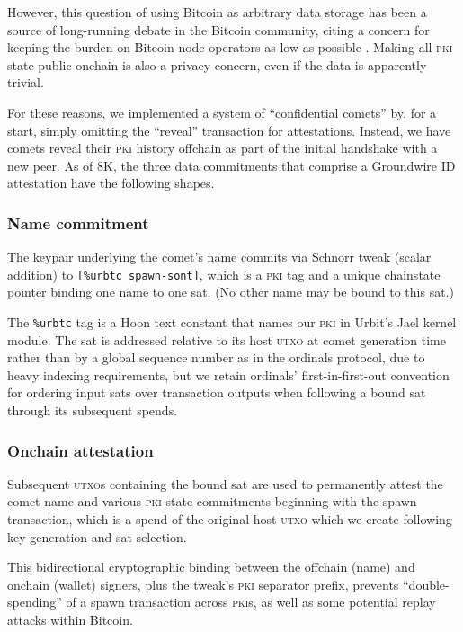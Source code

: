 \documentclass[twoside]{article}
\begin{document}
However, this question of using Bitcoin as arbitrary data storage has
been a source of long-running debate in the Bitcoin community, citing a
concern for keeping the burden on Bitcoin node operators as low as
possible \citep{BIP0110}. Making all \textsc{pki}
state public onchain is also a privacy concern, even if the data is
apparently trivial.

For these reasons, we implemented a system of ``confidential comets''
by, for a start, simply omitting the ``reveal'' transaction for
attestations. Instead, we have comets reveal their \textsc{pki} history offchain
as part of the initial handshake with a new peer. As of 8K, the three
data commitments that comprise a Groundwire ID attestation have the
following shapes.

\subsubsection{Name commitment}\label{name-commitment}

The keypair underlying the comet's name commits via Schnorr tweak
(scalar addition) to \texttt{{[}\%urbtc\ spawn-sont{]}}, which is a \textsc{pki}
tag and a unique chainstate pointer binding one name to one sat. (No
other name may be bound to this sat.)

The \texttt{\%urbtc} tag is a Hoon text constant that names our \textsc{pki} in
Urbit's Jael kernel module. The sat is addressed relative to its host
\textsc{utxo} at comet generation time rather than by a global sequence number as
in the ordinals protocol, due to heavy indexing requirements, but we
retain ordinals' first-in-first-out convention for ordering input sats
over transaction outputs when following a bound sat through its
subsequent spends.

\subsubsection{Onchain attestation}\label{onchain-attestation}

Subsequent \textsc{utxo}s containing the bound sat are used to permanently attest
the comet name and various \textsc{pki} state commitments beginning with the
spawn transaction, which is a spend of the original host \textsc{utxo} which we
create following key generation and sat selection.

This bidirectional cryptographic binding between the offchain (name) and
onchain (wallet) signers, plus the tweak's \textsc{pki} separator prefix,
prevents ``double-spending'' of a spawn transaction across \textsc{pki}s, as well
as some potential replay attacks within Bitcoin.
\end{document}
